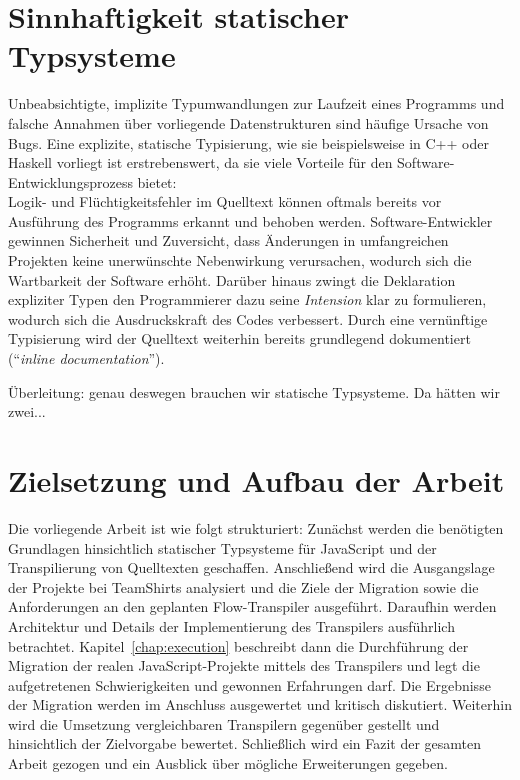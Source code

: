 
\section{Sinnhaftigkeit statischer Typsysteme}

Unbeabsichtigte, implizite Typumwandlungen zur Laufzeit eines Programms und falsche Annahmen über vorliegende Datenstrukturen sind häufige Ursache von Bugs. Eine explizite, statische Typisierung, wie sie beispielsweise in C++ oder Haskell vorliegt ist erstrebenswert, da sie viele Vorteile für den Software-Entwicklungsprozess bietet:\\
Logik- und Flüchtigkeitsfehler im Quelltext können oftmals bereits vor Ausführung des Programms erkannt und behoben werden. Software-Entwickler gewinnen Sicherheit und Zuversicht, dass Änderungen in umfangreichen Projekten keine unerwünschte Nebenwirkung verursachen, wodurch sich die Wartbarkeit der Software erhöht. Darüber hinaus zwingt die Deklaration expliziter Typen den Programmierer dazu seine \emph{Intension} klar zu formulieren, wodurch sich die Ausdruckskraft des Codes verbessert. Durch eine vernünftige Typisierung wird der Quelltext weiterhin bereits grundlegend dokumentiert (\enquote{\textit{inline documentation}}).


Überleitung: genau deswegen brauchen wir statische Typsysteme. Da hätten wir zwei...

\section{Zielsetzung und Aufbau der Arbeit}


Die vorliegende Arbeit ist wie folgt strukturiert: Zunächst werden die benötigten Grundlagen hinsichtlich statischer Typsysteme für JavaScript und der Transpilierung von Quelltexten geschaffen. Anschließend wird die Ausgangslage der Projekte bei TeamShirts analysiert und die Ziele der Migration sowie die Anforderungen an den geplanten Flow-Transpiler ausgeführt. Daraufhin werden Architektur und Details der Implementierung des Transpilers ausführlich betrachtet. Kapitel~\ref{chap:execution} beschreibt dann die Durchführung der Migration der realen JavaScript-Projekte mittels des Transpilers und legt die aufgetretenen Schwierigkeiten und gewonnen Erfahrungen darf. Die Ergebnisse der Migration werden im Anschluss ausgewertet und kritisch diskutiert. Weiterhin wird die Umsetzung vergleichbaren Transpilern gegenüber gestellt und hinsichtlich der Zielvorgabe bewertet. Schließlich wird ein Fazit der gesamten Arbeit gezogen und ein Ausblick über mögliche Erweiterungen gegeben.
